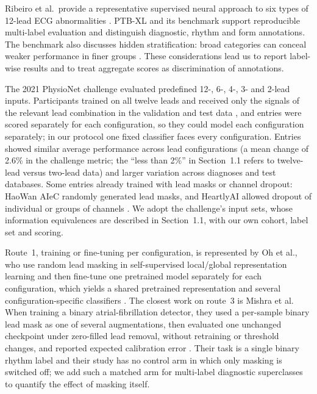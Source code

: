 Ribeiro et al.\ provide a representative supervised neural approach to six types of 12-lead ECG abnormalities \citep{ribeiro2020diagnosis}. PTB-XL and its benchmark support reproducible multi-label evaluation and distinguish diagnostic, rhythm and form annotations. The benchmark also discusses hidden stratification: broad categories can conceal weaker performance in finer groups \citep{wagner2020ptbxl,strodthoff2021benchmark}. These considerations lead us to report label-wise results and to treat aggregate scores as discrimination of annotations.

The 2021 PhysioNet challenge evaluated predefined 12-, 6-, 4-, 3- and 2-lead inputs. Participants trained on all twelve leads and received only the signals of the relevant lead combination in the validation and test data \citep{reyna2021willtwo}, and entries were scored separately for each configuration, so they could model each configuration separately; in our protocol one fixed classifier faces every configuration. Entries showed similar average performance across lead configurations (a mean change of 2.6\% in the challenge metric; the ``less than 2\%'' in Section~1.1 refers to twelve-lead versus two-lead data) and larger variation across diagnoses and test databases. Some entries already trained with lead masks or channel dropout: HaoWan AIeC randomly generated lead masks, and HeartlyAI allowed dropout of individual or groups of channels \citep{reyna2022issues}. We adopt the challenge's input sets, whose information equivalences are described in Section~1.1, with our own cohort, label set and scoring.

Route~1, training or fine-tuning per configuration, is represented by Oh et al., who use random lead masking in self-supervised local/global representation learning and then fine-tune one pretrained model separately for each configuration, which yields a shared pretrained representation and several configuration-specific classifiers \citep{oh2022leadagnostic}. The closest work on route~3 is Mishra et al. When training a binary atrial-fibrillation detector, they used a per-sample binary lead mask as one of several augmentations, then evaluated one unchanged checkpoint under zero-filled lead removal, without retraining or threshold changes, and reported expected calibration error \citep{fast2026af}. Their task is a single binary rhythm label and their study has no control arm in which only masking is switched off; we add such a matched arm for multi-label diagnostic superclasses to quantify the effect of masking itself.

